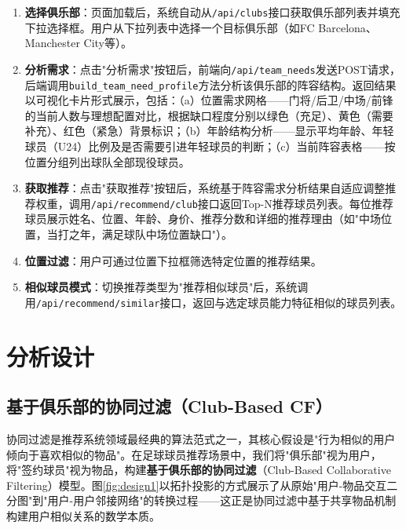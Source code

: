 \documentclass[a4paper]{article}
\begin{document}
\begin{enumerate}
    \item \textbf{选择俱乐部}：页面加载后，系统自动从\texttt{/api/clubs}接口获取俱乐部列表并填充下拉选择框。用户从下拉列表中选择一个目标俱乐部（如FC Barcelona、Manchester City等）。
    \item \textbf{分析需求}：点击"分析需求"按钮后，前端向\texttt{/api/team\_needs}发送POST请求，后端调用\texttt{build\_team\_need\_profile}方法分析该俱乐部的阵容结构。返回结果以可视化卡片形式展示，包括：（a）位置需求网格——门将/后卫/中场/前锋的当前人数与理想配置对比，根据缺口程度分别以绿色（充足）、黄色（需要补充）、红色（紧急）背景标识；（b）年龄结构分析——显示平均年龄、年轻球员（U24）比例及是否需要引进年轻球员的判断；（c）当前阵容表格——按位置分组列出球队全部现役球员。
    \item \textbf{获取推荐}：点击"获取推荐"按钮后，系统基于阵容需求分析结果自适应调整推荐权重，调用\texttt{/api/recommend/club}接口返回Top-N推荐球员列表。每位推荐球员展示姓名、位置、年龄、身价、推荐分数和详细的推荐理由（如"中场位置，当打之年，满足球队中场位置缺口"）。
    \item \textbf{位置过滤}：用户可通过位置下拉框筛选特定位置的推荐结果。
    \item \textbf{相似球员模式}：切换推荐类型为"推荐相似球员"后，系统调用\texttt{/api/recommend/similar}接口，返回与选定球员能力特征相似的球员列表。
\end{enumerate}


\section{分析设计}

\subsection{基于俱乐部的协同过滤（Club-Based CF）}

协同过滤是推荐系统领域最经典的算法范式之一，其核心假设是"行为相似的用户倾向于喜欢相似的物品"。在足球球员推荐场景中，我们将"俱乐部"视为用户，将"签约球员"视为物品，构建\textbf{基于俱乐部的协同过滤}（Club-Based Collaborative Filtering）模型。图\ref{fig:design1}以拓扑投影的方式展示了从原始"用户-物品交互二分图"到"用户-用户邻接网络"的转换过程——这正是协同过滤中基于共享物品机制构建用户相似关系的数学本质。
\end{document}
